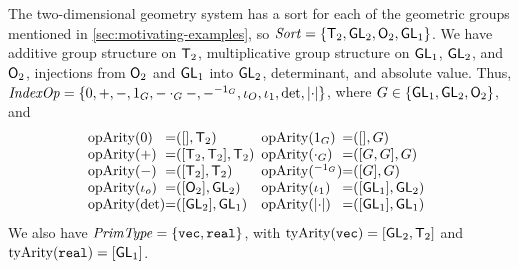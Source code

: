 \begin{example}
  \label{ex:two-dim-geo-operations}
  The two-dimensional geometry system has a sort for each of the
  geometric groups mentioned in \autoref{sec:motivating-examples}, so
  $\mathit{Sort} = \{\mathsf{T}_2, \mathsf{GL}_2, \mathsf{O}_2, \mathsf{GL}_1 \}$.
  We have additive group structure on $\mathsf{T}_2$, multiplicative
  group structure on $\mathsf{GL}_1$, $\mathsf{GL}_2$, and $\mathsf{O}_2$,
  injections from $\mathsf{O}_2$ and $\mathsf{GL}_1$ into $\mathsf{GL}_2$,
  determinant, and absolute value. Thus, $\mathit{IndexOp} = \{ 0, +, -,
  1_G, -\cdot_G-, -^{-1_G}, \iota_O, \iota_1, \det, \lvert \cdot \rvert \}$, where
  $G \in \{\mathsf{GL}_1, \mathsf{GL}_2, \mathsf{O}_2\}$, and
  \begin{displaymath}
    \begin{array}{@{}l@{\hspace{0em}=\hspace{0em}}l@{\hspace{0.5em}}l@{\hspace{0em}=\hspace{0em}}l}
      \indexOpArity(0) & ([], \SynTransl{2}) &
      \indexOpArity(1_G) & ([], G) \\
      \indexOpArity(+) & ([\SynTransl{2}, \SynTransl{2}], \SynTransl{2}) &
      \indexOpArity(\cdot_G) & ([G,G],G) \\
      \indexOpArity(-) & ([\SynTransl{2}], \SynTransl{2}) &
      \indexOpArity(^{-1_G}) & ([G], G) \\
      \indexOpArity(\iota_o) & ([\SynOrth{2}], \SynGL{2}) &
      \indexOpArity(\iota_1) & ([\SynGL{1}], \SynGL{2}) \\
      \indexOpArity(\det) & ([\SynGL{2}], \SynGL{1}) &
      \indexOpArity(\abs{\cdot}) & ([\SynGL{1}], \SynGL{1})
    \end{array}
  \end{displaymath}
We also have $\mathit{PrimType} = \{ \textup{\texttt{vec}},
  \textup{\texttt{real}} \}$, with $\mathrm{tyArity}(\textup{\texttt{vec}}) =
           [\mathsf{GL}_2, \mathsf{T}_2]$ and
           $\mathrm{tyArity}(\textup{\texttt{real}}) = [\mathsf{GL}_1]$.
\end{example}

